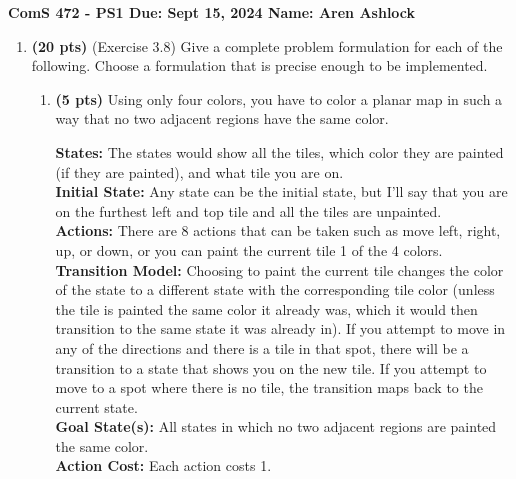 \documentclass{article}
\begin{document}
\noindent\textbf{ComS 472 - PS1 \quad Due: Sept 15, 2024 \quad Name: Aren Ashlock}

\begin{enumerate}


\item \textbf{(20 pts)} (Exercise 3.8) Give a complete problem formulation for each of the following. Choose a formulation that is precise enough to be implemented.

    \begin{enumerate}[label=($\alph*$)]
    
    
    \item \textbf{(5 pts)} Using only four colors, you have to color a planar map in such a way that no two adjacent regions have the same color.

    \color{blue}
        \textbf{States:} The states would show all the tiles, which color they are painted (if they are painted), and what tile you are on. \\
        \textbf{Initial State:} Any state can be the initial state, but I'll say that you are on the furthest left and top tile and all the tiles are unpainted. \\
        \textbf{Actions:} There are 8 actions that can be taken such as move left, right, up, or down, or you can paint the current tile 1 of the 4 colors. \\
        \textbf{Transition Model:} Choosing to paint the current tile changes the color of the state to a different state with the corresponding tile color (unless the tile is painted the same color it already was, which it would then transition to the same state it was already in). If you attempt to move in any of the directions and there is a tile in that spot, there will be a transition to a state that shows you on the new tile. If you attempt to move to a spot where there is no tile, the transition maps back to the current state. \\
        \textbf{Goal State(s):} All states in which no two adjacent regions are painted the same color. \\
        \textbf{Action Cost:} Each action costs 1.
    \color{black}



\end{enumerate}
\end{enumerate}
\end{document}
